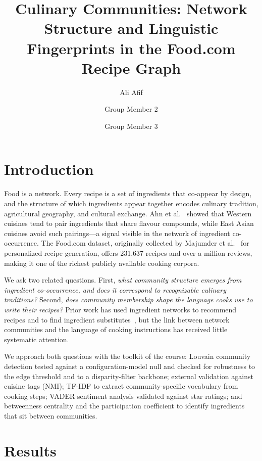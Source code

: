 \documentclass[9pt,twocolumn]{pnas-new}
\title{Culinary Communities: Network Structure and Linguistic Fingerprints in the Food.com Recipe Graph}
\author[a,1]{Ali Afif}
\author[a]{Group Member 2}
\author[a]{Group Member 3}
\affil[a]{Technical University of Denmark, DTU Compute, Kongens Lyngby, Denmark}
\begin{document}
\maketitle
\thispagestyle{firststyle}

\section*{Introduction}

Food is a network. Every recipe is a set of ingredients that co-appear by design, and the structure of which ingredients appear together encodes culinary tradition, agricultural geography, and cultural exchange. Ahn et al.~\cite{ahn2011flavor} showed that Western cuisines tend to pair ingredients that share flavour compounds, while East Asian cuisines avoid such pairings---a signal visible in the network of ingredient co-occurrence. The Food.com dataset, originally collected by Majumder et al.~\cite{majumder2019generating} for personalized recipe generation, offers 231,637 recipes and over a million reviews, making it one of the richest publicly available cooking corpora.

We ask two related questions. First, \textit{what community structure emerges from ingredient co-occurrence, and does it correspond to recognizable culinary traditions?} Second, \textit{does community membership shape the language cooks use to write their recipes?} Prior work has used ingredient networks to recommend recipes and to find ingredient substitutes~\cite{teng2012recipe}, but the link between network communities and the language of cooking instructions has received little systematic attention.

We approach both questions with the toolkit of the course: Louvain community detection tested against a configuration-model null and checked for robustness to the edge threshold and to a disparity-filter backbone; external validation against cuisine tags (NMI); TF-IDF to extract community-specific vocabulary from cooking steps; VADER sentiment analysis validated against star ratings; and betweenness centrality and the participation coefficient to identify ingredients that sit between communities.

\section*{Results}
\end{document}
